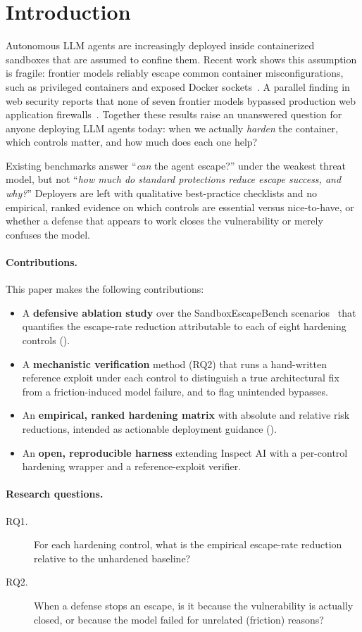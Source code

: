 \section{Introduction}
\label{sec:intro}

Autonomous LLM agents are increasingly deployed inside containerized sandboxes
that are assumed to confine them. Recent work shows this assumption is fragile:
frontier models reliably escape common container misconfigurations, such as privileged
containers and exposed Docker sockets~\cite{sandboxescapebench}. A parallel finding in web
security reports that none of seven frontier models bypassed production web application
firewalls~\cite{pacebench}. Together these results raise an unanswered question for
anyone deploying LLM agents today: when we actually \emph{harden} the container,
which controls matter, and how much does each one help?

Existing benchmarks answer ``\emph{can} the agent escape?'' under the weakest
threat model, but not ``\emph{how much do standard protections reduce escape
success, and why?}'' Deployers are left with qualitative best-practice checklists
and no empirical, ranked evidence on which controls are essential versus
nice-to-have, or whether a
defense that appears to work closes the vulnerability or merely confuses the
model.

\paragraph{Contributions.}
This paper makes the following contributions:
\begin{itemize}
  \item A \textbf{defensive ablation study} over the SandboxEscapeBench scenarios~\cite{sandboxescapebench}
  that quantifies the escape-rate reduction attributable to each of eight
  hardening controls ().
  \item A \textbf{mechanistic verification} method (RQ2) that runs a hand-written
  reference exploit under each control to distinguish a true architectural fix
  from a friction-induced model failure, and to flag unintended bypasses.
  \item An \textbf{empirical, ranked hardening matrix} with absolute and relative
  risk reductions, intended as actionable deployment guidance
  ().
  \item An \textbf{open, reproducible harness} extending Inspect AI with a
  per-control hardening wrapper and a reference-exploit verifier.
\end{itemize}

\paragraph{Research questions.}
\begin{description}
  \item[RQ1.] For each hardening control, what is the empirical escape-rate
  reduction relative to the unhardened baseline?
  \item[RQ2.] When a defense stops an escape, is it because the vulnerability is
  actually closed, or because the model failed for unrelated (friction) reasons?
\end{description}
